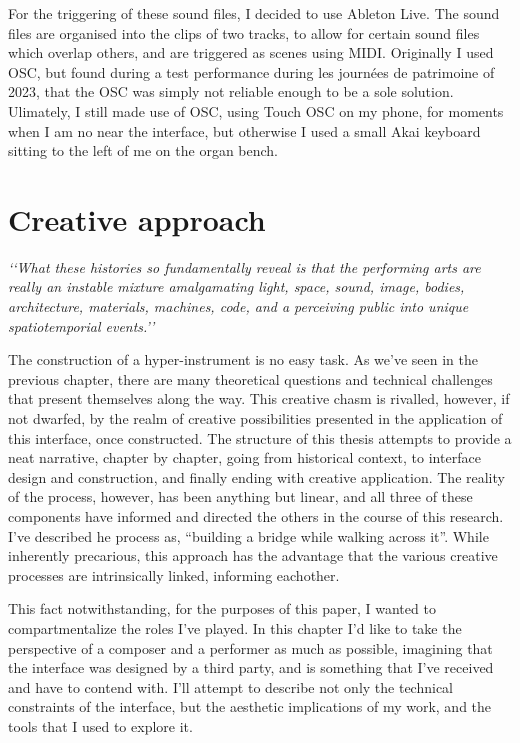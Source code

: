 \documentclass[12pt,twoside,maitrise]{dms_ks}
\theoremstyle{definition}
\begin{document}
For the triggering of these sound files, I decided to use Ableton Live. 
The sound files are organised into the clips of two tracks, to allow for certain sound files which overlap others, and are triggered as scenes using MIDI. 
Originally I used OSC, but found during a test performance during les journées de patrimoine of 2023, that the OSC was simply not reliable enough to be a sole solution. 
Ulimately, I still made use of OSC, using Touch OSC on my phone, for moments when I am no near the interface, but otherwise I used a small Akai keyboard sitting to the left of me on the organ bench.

\chapter{Creative approach}

\epigraph{\textit{‘‘What these histories so fundamentally reveal is that the performing arts are really an instable mixture amalgamating light, space, sound, image, bodies, architecture, materials, machines, code, and a perceiving public into unique spatiotemporial events.’’}\footnotemark}{}

The construction of a hyper-instrument is no easy task.
As we've seen in the previous chapter, there are many theoretical questions and technical challenges that present themselves along the way.
This creative chasm is rivalled, however, if not dwarfed, by the realm of creative possibilities presented in the application of this interface, once constructed.
The structure of this thesis attempts to provide a neat narrative, chapter by chapter, going from historical context, to interface design and construction, and finally ending with creative application.
The reality of the process, however, has been anything but linear, and all three of these components have informed and directed the others in the course of this research.
I’ve described he process as, “building a bridge while walking across it”.
While inherently precarious, this approach has the advantage that the various creative processes are intrinsically linked, informing eachother.

This fact notwithstanding, for the purposes of this paper, I wanted to compartmentalize the roles I’ve played.
In this chapter I’d like to take the perspective of a composer and a performer as much as possible, imagining that the interface was designed by a third party, and is something that I’ve received and have to contend with.
I’ll attempt to describe not only the technical constraints of the interface, but the aesthetic implications of my work, and the tools that I used to explore it.
\end{document}
